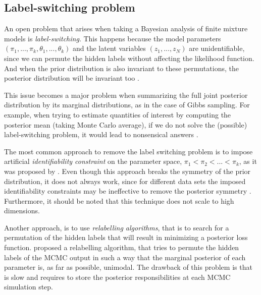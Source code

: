 \subsection{Label-switching problem} \label{fdmm-relable-subsect}
An open problem that arises when taking a Bayesian analysis of finite mixture models is \emph{label-switching}. This happens because the model parameters $(\pi_{1},...,\pi_{k},\theta_{1},...,\theta_{k})$ and the latent variables $(z_{1},...,z_{N})$ are unidentifiable, since we can permute the hidden labels without affecting the likelihood function. And when the prior distribution is also invariant to these permutations, the posterior distribution will be invariant too \citep{Rufo2006}.

This issue becomes a major problem when summarizing the full joint posterior distribution by its marginal distributions, as in the case of Gibbs sampling. For example, when trying to estimate quantities of interest by computing the posterior mean (\ie taking Monte Carlo average), if we do not solve the (possible) label-switching problem, it would lead to nonsensical answers \citep{Stephens2000}. 

The most common approach to remove the label switching problem is to impose artificial \emph{identifiability constraint} on the parameter space, \eg $\pi_{1} < \pi_{2} < ... < \pi_{k}$, as it was proposed by \citet{Richardson1997}. Even though this approach breaks the symmetry of the prior distribution, it does not always work, since for different data sets the imposed identifiability constraints may be ineffective to remove the posterior symmetry \citep{Celeux2000}. Furthermore, it should be noted that this technique does not scale to high dimensions. 

Another approach, is to use \emph{relabelling algorithms}, that is to search for a permutation of the hidden labels that will result in minimizing a posterior loss function. \citet{Stephens2000} proposed a relabelling algorithm, that tries to permute the hidden labels of the MCMC output in such a way that the marginal posterior of each parameter is, as far as possible, unimodal. The drawback of this problem is that is slow and requires to store the posterior responsibilities at each MCMC simulation step. 